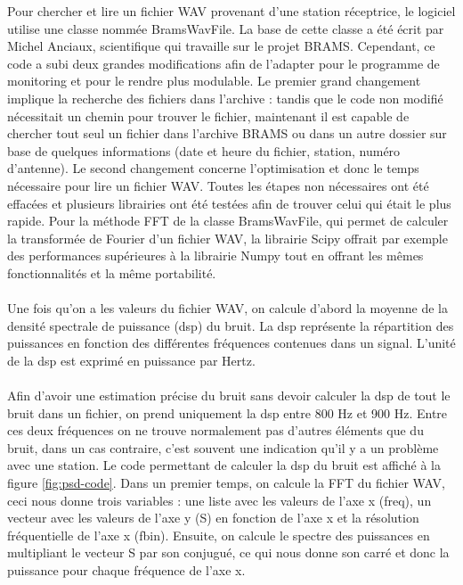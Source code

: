 \documentclass[11pt]{article}
\begin{document}
Pour chercher et lire un fichier WAV provenant d'une station réceptrice, le logiciel utilise une classe nommée BramsWavFile.
La base de cette classe a été écrit par Michel Anciaux, scientifique qui travaille sur le projet BRAMS.
Cependant, ce code a subi deux grandes modifications afin de l'adapter pour le programme de monitoring et pour le rendre plus modulable.
Le premier grand changement implique la recherche des fichiers dans l'archive : tandis que le code non modifié nécessitait un chemin pour trouver le fichier, maintenant il est capable de chercher tout seul un fichier dans l'archive BRAMS ou dans un autre dossier sur base de quelques informations (date et heure du fichier, station, numéro d'antenne).
Le second changement concerne l'optimisation et donc le temps nécessaire pour lire un fichier WAV.
Toutes les étapes non nécessaires ont été effacées et plusieurs librairies ont été testées afin de trouver celui qui était le plus rapide.
Pour la méthode FFT de la classe BramsWavFile, qui permet de calculer la transformée de Fourier d'un fichier WAV, la librairie Scipy offrait par exemple des performances supérieures à la librairie Numpy tout en offrant les mêmes fonctionnalités et la même portabilité.\\
\\
Une fois qu'on a les valeurs du fichier WAV, on calcule d'abord la moyenne de la densité spectrale de puissance (dsp) du bruit.
La dsp représente la répartition des puissances en fonction des différentes fréquences contenues dans un signal.
L'unité de la dsp est exprimé en puissance par Hertz.\\
\\
Afin d'avoir une estimation précise du bruit sans devoir calculer la dsp de tout le bruit dans un fichier, on prend uniquement la dsp entre 800 Hz et 900 Hz.
Entre ces deux fréquences on ne trouve normalement pas d'autres éléments que du bruit, dans un cas contraire, c'est souvent une indication qu'il y a un problème avec une station.
Le code permettant de calculer la dsp du bruit est affiché à la figure \ref{fig:psd-code}.
Dans un premier temps, on calcule la FFT du fichier WAV, ceci nous donne trois variables : une liste avec les valeurs de l'axe x (freq), un vecteur avec les valeurs de l'axe y (S) en fonction de l'axe x et la résolution fréquentielle de l'axe x (fbin).
Ensuite, on calcule le spectre des puissances en multipliant le vecteur S par son conjugué, ce qui nous donne son carré et donc la puissance pour chaque fréquence de l'axe x.
\end{document}
